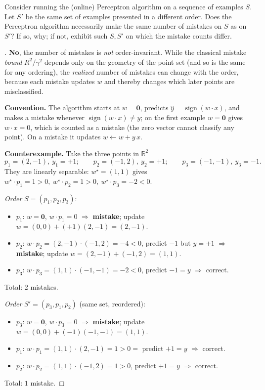 \documentclass[en,hazy,blue,12pt,normal]{../../elegantnote}
\begin{document}
\begin{homework}
Consider running the (online) Perceptron algorithm on a sequence of examples $S$. Let $S'$ be the
same set of examples presented in a different order. Does the Perceptron algorithm necessarily make
the same number of mistakes on $S$ as on $S'$? If so, why; if not, exhibit such $S,S'$ on which the
mistake counts differ.
\end{homework}

\begin{proof}[\solutionname]
\textbf{No}, the number of mistakes is \emph{not} order-invariant. While the classical mistake
\emph{bound} $R^2/\gamma^2$ depends only on the geometry of the point set (and so is the same for any
ordering), the \emph{realized} number of mistakes can change with the order, because each mistake
updates $w$ and thereby changes which later points are misclassified.

\medskip
\textbf{Convention.} The algorithm starts at $w=\bm 0$, predicts $\hat y=\operatorname{sign}(w\cdot x)$,
and makes a mistake whenever $\operatorname{sign}(w\cdot x)\neq y$; on the first example $w=\bm 0$
gives $w\cdot x=0$, which is counted as a mistake (the zero vector cannot classify any point). On a
mistake it updates $w\leftarrow w+y\,x$.

\medskip
\textbf{Counterexample.} Take the three points in $\mathbb R^2$
\[
p_1=(2,-1),\ y_1=+1;\qquad p_2=(-1,2),\ y_2=+1;\qquad p_3=(-1,-1),\ y_3=-1 .
\]
They are linearly separable: $w^\star=(1,1)$ gives $w^\star\!\cdot p_1=1>0,\ w^\star\!\cdot p_2=1>0,\
w^\star\!\cdot p_3=-2<0$.

\emph{Order} $S=(p_1,p_2,p_3)$:
\begin{itemize}
\item $p_1$: $w=\bm 0$, $w\cdot p_1=0$ $\Rightarrow$ \textbf{mistake}; update $w=(0,0)+(+1)(2,-1)=(2,-1)$.
\item $p_2$: $w\cdot p_2=(2,-1)\cdot(-1,2)=-4<0$, predict $-1$ but $y=+1$ $\Rightarrow$ \textbf{mistake};
      update $w=(2,-1)+(-1,2)=(1,1)$.
\item $p_3$: $w\cdot p_3=(1,1)\cdot(-1,-1)=-2<0$, predict $-1=y$ $\Rightarrow$ correct.
\end{itemize}
Total: $\boxed{2}$ mistakes.

\emph{Order} $S'=(p_3,p_1,p_2)$ (same set, reordered):
\begin{itemize}
\item $p_3$: $w=\bm 0$, $w\cdot p_3=0$ $\Rightarrow$ \textbf{mistake}; update $w=(0,0)+(-1)(-1,-1)=(1,1)$.
\item $p_1$: $w\cdot p_1=(1,1)\cdot(2,-1)=1>0=$ predict $+1=y$ $\Rightarrow$ correct.
\item $p_2$: $w\cdot p_2=(1,1)\cdot(-1,2)=1>0$, predict $+1=y$ $\Rightarrow$ correct.
\end{itemize}
Total: $\boxed{1}$ mistake.


\end{proof}
\end{document}
